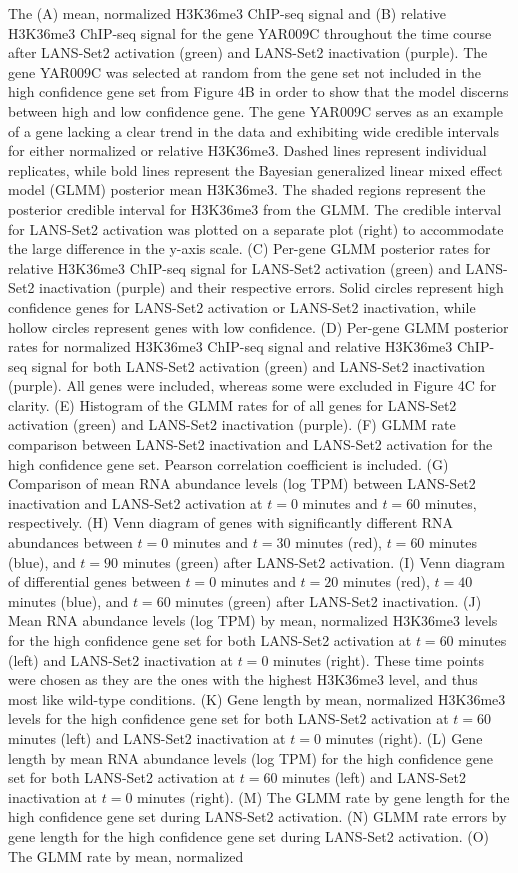\documentclass[11pt]{biorxiv}
\begin{document}
\noindent The (A) mean, normalized H3K36me3 ChIP-seq signal and (B) relative H3K36me3 ChIP-seq signal for the gene YAR009C throughout the time course after LANS-Set2 activation (green) and LANS-Set2 inactivation (purple). The gene YAR009C was selected at random from the gene set not included in the high confidence gene set from Figure 4B in order to show that the model discerns between high and low confidence gene. The gene YAR009C serves as an example of a gene lacking a clear trend in the data and exhibiting wide credible intervals for either normalized or relative H3K36me3. Dashed lines represent individual replicates, while bold lines represent the Bayesian generalized linear mixed effect model (GLMM) posterior mean H3K36me3. The shaded regions represent the posterior credible interval for H3K36me3 from the GLMM. The credible interval for LANS-Set2 activation was plotted on a separate plot (right) to accommodate the large difference in the y-axis scale. (C) Per-gene GLMM posterior rates for relative H3K36me3 ChIP-seq signal for LANS-Set2 activation (green) and LANS-Set2 inactivation (purple) and their respective errors. Solid circles represent high confidence genes for LANS-Set2 activation or LANS-Set2 inactivation, while hollow circles represent genes with low confidence. (D) Per-gene GLMM posterior rates for normalized H3K36me3 ChIP-seq signal and relative H3K36me3 ChIP-seq signal for both LANS-Set2 activation (green) and LANS-Set2 inactivation (purple). All genes were included, whereas some were excluded in Figure 4C for clarity. (E) Histogram of the GLMM rates for of all genes for LANS-Set2 activation (green) and LANS-Set2 inactivation (purple). (F) GLMM rate comparison between LANS-Set2 inactivation and LANS-Set2 activation for the high confidence gene set. Pearson correlation coefficient is included. (G) Comparison of mean RNA abundance levels (log TPM) between LANS-Set2 inactivation and LANS-Set2 activation at $t=0$ minutes and $t=60$ minutes, respectively. (H) Venn diagram of genes with significantly different RNA abundances between $t=0$ minutes and $t=30$ minutes (red), $t=60$ minutes (blue), and $t=90$ minutes (green) after LANS-Set2 activation. (I) Venn diagram of differential genes between $t=0$ minutes and $t=20$ minutes (red), $t=40$ minutes (blue), and $t=60$ minutes (green) after LANS-Set2 inactivation. (J) Mean RNA abundance levels (log TPM) by mean, normalized H3K36me3 levels for the high confidence gene set for both LANS-Set2 activation at $t=60$ minutes (left) and LANS-Set2 inactivation at $t=0$ minutes (right). These time points were chosen as they are the ones with the highest H3K36me3 level, and thus most like wild-type conditions. (K) Gene length by mean, normalized H3K36me3 levels for the high confidence gene set for both LANS-Set2 activation at $t=60$ minutes (left) and LANS-Set2 inactivation at $t=0$ minutes (right). (L) Gene length by mean RNA abundance levels (log TPM) for the high confidence gene set for both LANS-Set2 activation at $t=60$ minutes (left) and LANS-Set2 inactivation at $t=0$ minutes (right). (M) The GLMM rate by gene length for the high confidence gene set during LANS-Set2 activation. (N) GLMM rate errors by gene length for the high confidence gene set during LANS-Set2 activation. (O) The GLMM rate by mean, normalized 
\end{document}
